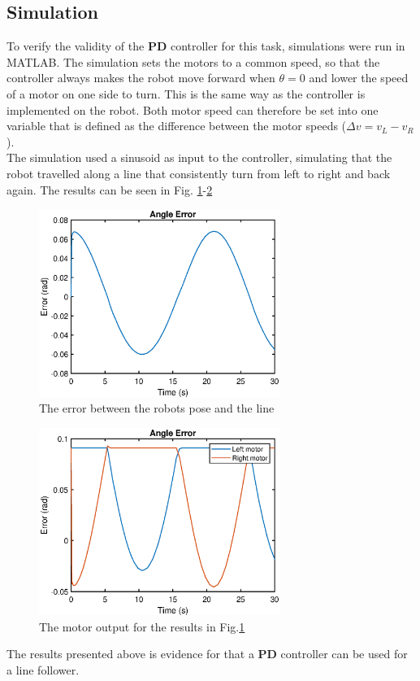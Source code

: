\subsection{Simulation}

To verify the validity of the \textbf{PD} controller for this task, simulations were run in MATLAB. The simulation sets the motors to a common speed, so that the controller always makes the robot move forward when $\theta=0$ and lower the speed of a motor on one side to turn. This is the same way as the controller is implemented on the robot. Both motor speed can therefore be set into one variable that is defined as the difference between the motor speeds ($\Delta v = v_L-v_R$). \\
\indent The simulation used a sinusoid as input to the controller, simulating that the robot travelled along a line that consistently turn from left to right and back again. The results can be seen in Fig. \ref{fig:sim_t_error}-\ref{fig:sim_LR_motor}

\begin{figure}[H]
    \centering
    \includegraphics[width=0.7\textwidth]{img/theta_error.eps}
    \caption{The error between the robots pose and the line}
    \label{fig:sim_t_error}
\end{figure}

\begin{figure}[H]
    \centering
    \includegraphics[width=0.7\textwidth]{img/LR_motors.eps}
    \caption{The motor output for the results in Fig.\ref{fig:sim_t_error}}
    \label{fig:sim_LR_motor}
\end{figure}

The results presented above is evidence for that a \textbf{PD} controller can be used for a line follower. 
